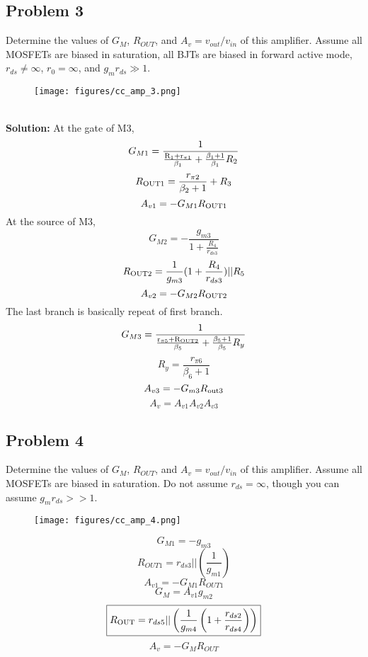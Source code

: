\documentclass{article}
\begin{document}
\subsection*{Problem 3}
Determine the values of $G_M$, $R_{OUT}$, and $A_v = v_{out}/v_{in}$ of this amplifier.  Assume all MOSFETs are biased in saturation, all BJTs are biased in forward active mode, $r_{ds} \ne \infty$, $r_0 = \infty$, and $g_mr_{ds} \gg 1$.
\begin{figure}[!h]
\begin{center}
    \texttt{[image: figures/cc\_amp\_3.png]}
\end{center}
\end{figure} \\
\textbf{Solution:}
At the gate of M3,
$$G_{M1} = \frac{1}{\frac{\rm R_{1} + r_{\pi 1}}{\beta_1} + \frac{\beta_1 + 1}{\beta_1} R_2} $$
$$R_{\rm OUT1} = \frac{r_{\pi 2}}{\beta_2 + 1} + R_3$$
$$A_{v1} = -G_{M1}R_{\rm OUT1}$$
At the source of M3,
$$G_{M2} = -\frac{g_{m3}}{1+\frac{R_4}{r_{ds3}}}$$
$$R_{\rm OUT2} = \frac{1}{g_{m3}} (1 + \frac{R_4}{r_{ds3}}) || R_5$$
$$A_{v2} = -G_{M2}R_{\rm OUT2}$$
The last branch is basically repeat of first branch.
$$G_{M3} = \frac{1}{\frac{\rm  r_{\pi 5} + R_{OUT2}}{\beta_5} + \frac{\beta_5 + 1}{\beta_5} R_y}$$
$$R_y = \frac{r_{\pi 6}}{\beta_6 + 1}$$
$$A_{v3} = -G_{m3}R_{\rm out3}$$
$$A_{v} = A_{v1}A_{v2}A_{v3}$$
\newpage
\subsection*{Problem 4}
Determine the values of $G_M$, $R_{OUT}$, and $A_v = v_{out}/v_{in}$ of this amplifier.  Assume all MOSFETs are biased in saturation.  Do not assume $r_{ds} = \infty$, though you can assume $g_mr_{ds} >> 1$.
\begin{figure}[!h]
\begin{center}
    \texttt{[image: figures/cc\_amp\_4.png]}
\end{center}
\end{figure}
$$G_{M1} = -g_{m3}$$
$$R_{OUT1} = r_{ds3} || \left(\frac{1}{g_{m1}}\right)$$
$${A_{v1} = -G_{M1}R_{OUT1}}$$
$$\boxed{G_{M} = A_{v1}g_{m2}}$$
$$\boxed{R_{\rm OUT} = r_{ds5} || \left(\frac{1}{g_{m4}}\left(1 + \frac{r_{ds2}}{r_{ds4}}\right)\right)}$$
$$\boxed{A_{v} = -G_{M}R_{OUT}}$$
\newpage
\end{document}
